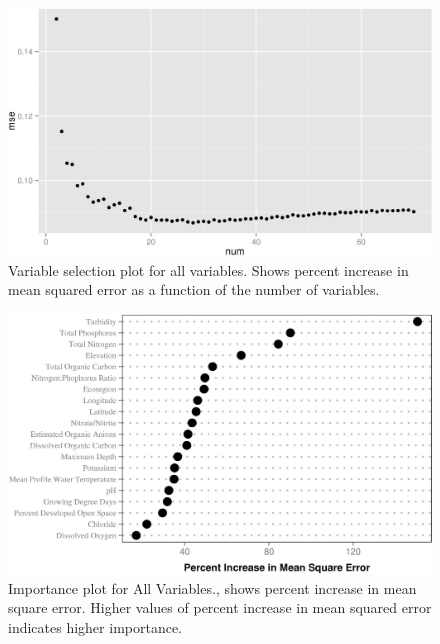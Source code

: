\documentclass[11pt,]{article}
\begin{document}
\begin{figure}[htbp]
\centering
\includegraphics{manuscript_files/figure-latex/all_var_sel_figure-1.jpeg}
\caption{Variable selection plot for all variables. Shows percent
increase in mean squared error as a function of the number of variables.
\label{fig:all_varsel_figure}}
\end{figure}

\newpage

\begin{figure}[htbp]
\centering
\includegraphics{manuscript_files/figure-latex/All_Importance-1.jpeg}
\caption{Importance plot for All Variables., shows percent increase in
mean square error. Higher values of percent increase in mean squared
error indicates higher importance. \label{fig:All_Importance}}
\end{figure}

\newpage

\newpage

\newpage
\end{document}
